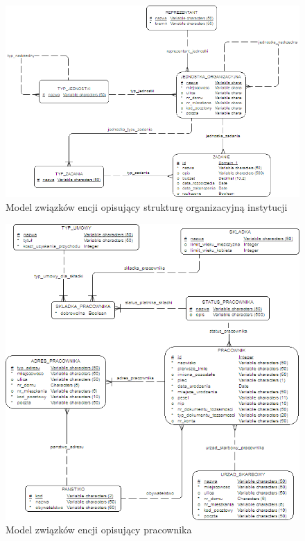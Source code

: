 \begin{figure}[tdh]
    \begin{center}
	\includegraphics[scale=.8]{img/logiczny1.png}
	\caption{Model związków encji opisujący strukturę organizacyjną instytucji}
	\label{logiczny1}
    \end{center}
\end{figure}
\begin{figure}[tdh]
    \begin{center}
	\includegraphics[scale=.8]{img/logiczny2.png}
	\caption{Model związków encji opisujący pracownika}
	\label{logiczny2}
    \end{center}
\end{figure}
